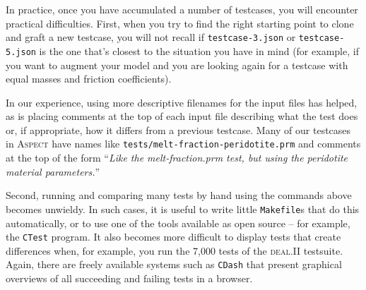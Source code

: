 \documentclass{article}
\newcommand{\dealii}{{\textsc{deal.II}}}
\newcommand{\aspect}{\textsc{Aspect}}
\begin{document}
In practice, once you have accumulated a number of testcases, you will
encounter practical difficulties. First, when you try to find the right
starting point to clone and graft a new testcase, you will not recall if
\texttt{testcase-3.json} or \texttt{testcase-5.json} is the one
that's closest to the situation you have in mind (for example, if you want to
augment your model and you are looking again for a testcase with equal masses
and friction coefficients). 

In our experience, using more descriptive filenames for the input files has
helped, as is placing comments at the top of each input file describing what
the test does or, if appropriate, how it differs from a previous
testcase. Many of our testcases in \aspect{} have names like
\texttt{tests/melt-fraction-peridotite.prm} and comments at the top of the
form ``\textit{Like the melt-fraction.prm test, but using the peridotite
  material parameters.}''

Second, running and comparing many tests by hand using the commands above
becomes unwieldy. In such cases, it is useful to write little
\texttt{Makefile}s that do this automatically, or to use one of the tools
available as open source -- for example, the \texttt{CTest} program. It also
becomes more difficult to display tests that create differences when, for
example, you run the 7,000 tests of the \dealii{} testsuite. Again, there are
freely available systems such as \texttt{CDash} that present graphical
overviews of all succeeding and failing tests in a browser.
\end{document}
